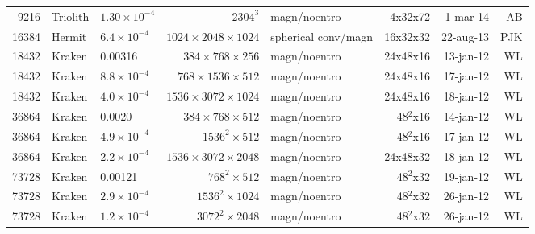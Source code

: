 \documentclass[\mydriver,12pt,twoside,notitlepage,a4paper]{article}
\begin{document}
\begin{center}
\begin{footnotesize}
\begin{longtable}{rllrlrrr}
9216&Triolith&$1.30{\!\times\!}10^{-4}$&$2304^3$&magn/noentro&4x32x72& 1-mar-14 & AB \\
16384&Hermit&$6.4{\!\times\!}10^{-4}$&$1024{\!\times\!}2048{\!\times\!}1024$&spherical conv/magn&16x32x32&22-aug-13&PJK\\
18432 & Kraken& 0.00316  &$384{\!\times\!}768{\!\times\!}256$ & magn/noentro & 24x48x16 &13-jan-12 & WL\\
18432 & Kraken&$8.8{\!\times\!}10^{-4}$  &$768{\!\times\!}1536{\!\times\!}512$ & magn/noentro & 24x48x16 &17-jan-12 & WL\\
18432 & Kraken& $4.0{\!\times\!}10^{-4}$ &$1536{\!\times\!}3072{\!\times\!}1024$ & magn/noentro & 24x48x16 &18-jan-12 & WL\\
36864 & Kraken& 0.0020  &$384{\!\times\!}768{\!\times\!}512$ & magn/noentro & 48$^2$x16 &14-jan-12 & WL\\
36864 & Kraken& $4.9{\!\times\!}10^{-4}$  &$1536^2{\!\times\!}512$ & magn/noentro & 48$^2$x16 &17-jan-12 & WL\\
36864 & Kraken& $2.2{\!\times\!}10^{-4}$  &$1536{\!\times\!}3072{\!\times\!}2048$ & magn/noentro & 24x48x32 &18-jan-12 & WL\\
73728 & Kraken& 0.00121  &$768^2{\!\times\!}512$ & magn/noentro & 48$^2$x32 &19-jan-12 & WL\\
73728 & Kraken& $2.9{\!\times\!}10^{-4}$ &$1536^2{\!\times\!}1024$ & magn/noentro & 48$^2$x32 &26-jan-12 & WL\\
73728 & Kraken& $1.2{\!\times\!}10^{-4}$  &$3072^2{\!\times\!}2048$ & magn/noentro & 48$^2$x32 &26-jan-12 & WL\\
\bottomrule
  \end{longtable}
    \end{footnotesize}
  \end{center}
\normalsize
\end{document}
